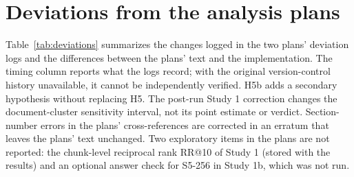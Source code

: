 \documentclass[11pt]{article}
\begin{document}
\FloatBarrier



\appendix
\section{Deviations from the analysis plans}\label{app:deviations}
Table~\ref{tab:deviations} summarizes the changes logged in the two plans' deviation logs and the differences between the plans' text and the implementation. The timing column reports what the logs record; with the original version-control history unavailable, it cannot be independently verified. H5b adds a secondary hypothesis without replacing H5. The post-run Study 1 correction changes the document-cluster sensitivity interval, not its point estimate or verdict. Section-number errors in the plans' cross-references are corrected in an erratum that leaves the plans' text unchanged. Two exploratory items in the plans are not reported: the chunk-level reciprocal rank RR@10 of Study 1 (stored with the results) and an optional answer check for S5-256 in Study 1b, which was not run.
\end{document}

